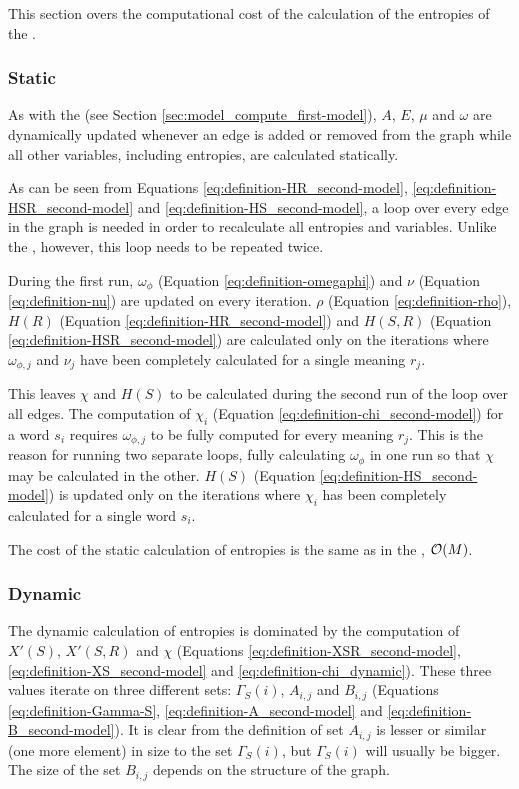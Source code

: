 This section overs the computational cost of the calculation of the entropies of the \secondmodel{}.

\subsubsection{Static}

As with the \firstmodel{} (see Section \ref{sec:model_compute_first-model}), $A$, $E$, $\mu$ and $\omega$ are dynamically updated whenever an edge is added or removed from the graph while all other variables, including entropies, are calculated statically.

As can be seen from Equations \eqref{eq:definition-HR_second-model}, \eqref{eq:definition-HSR_second-model} and \eqref{eq:definition-HS_second-model}, a loop over every edge in the graph is needed in order to recalculate all entropies and variables.
Unlike the \firstmodel{}, however, this loop needs to be repeated twice.

During the first run, $\omega_\phi$ (Equation \eqref{eq:definition-omegaphi}) and $\nu$ (Equation \eqref{eq:definition-nu}) are updated on every iteration.
$\rho$ (Equation \eqref{eq:definition-rho}), $H(R)$ (Equation \eqref{eq:definition-HR_second-model}) and $H(S,R)$ (Equation \eqref{eq:definition-HSR_second-model}) are calculated only on the iterations where $\omega_{\phi,j}$ and $\nu_j$ have been completely calculated for a single meaning $r_j$.

This leaves $\chi$ and $H(S)$ to be calculated during the second run of the loop over all edges.
The computation of $\chi_i$ (Equation \eqref{eq:definition-chi_second-model}) for a word $s_i$ requires $\omega_{\phi,j}$ to be fully computed for every meaning $r_j$.
This is the reason for running two separate loops, fully calculating $\omega_\phi$ in one run so that $\chi$ may be calculated in the other.
$H(S)$ (Equation \eqref{eq:definition-HS_second-model}) is updated only on the iterations where $\chi_i$ has been completely calculated for a single word $s_i$.

The cost of the static calculation of entropies is the same as in the \firstmodel, $\mathcal{O}(M)$.

\subsubsection{Dynamic}

The dynamic calculation of entropies is dominated by the computation of $X'(S)$, $X'(S,R)$ and $\chi$ (Equations \eqref{eq:definition-XSR_second-model}, \eqref{eq:definition-XS_second-model} and \eqref{eq:definition-chi_dynamic}).
These three values iterate on three different sets: $\Gamma_S(i)$, $A_{i,j}$ and $B_{i,j}$ (Equations \eqref{eq:definition-Gamma-S}, \eqref{eq:definition-A_second-model} and \eqref{eq:definition-B_second-model}).
It is clear from the definition of set $A_{i,j}$ is lesser or similar (one more element) in size to the set $\Gamma_S(i)$, but $\Gamma_S(i)$ will usually be bigger.
The size of the set $B_{i,j}$ depends on the structure of the graph.

